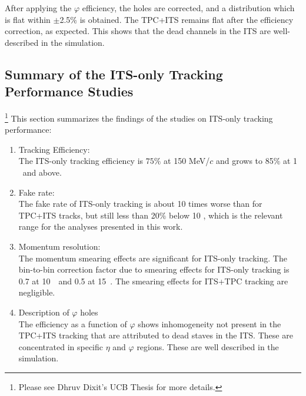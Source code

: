 
After applying the $\varphi$ efficiency, the holes are corrected, and a distribution which is flat within {$\pm$2.5\%} is obtained. The TPC+ITS remains flat after the efficiency correction, as expected. This shows that the dead channels in the ITS are well-described in the simulation. 

\subsection{Summary of the ITS-only Tracking Performance Studies}\footnote{Please see Dhruv Dixit's UCB Thesis for more details.}
\label{sec:sys_tracking}
This section summarizes the findings of the studies on ITS-only tracking performance: 
\begin{enumerate}
\item Tracking Efficiency: \\
The ITS-only tracking efficiency is $75\%$ at 150 MeV/$c$ and grows to 85$\%$ at 1 \GeVc~and above. 
\item Fake rate:\\
The fake rate of ITS-only tracking is about 10 times worse than for TPC+ITS tracks, but still less than 20$\%$ below 10 \GeVc, which is the relevant range for the analyses presented in this work.
\item Momentum resolution:\\
The momentum smearing effects are significant for ITS-only tracking. The bin-to-bin correction factor due to smearing effects for ITS-only tracking is 0.7 at 10~\GeVc~and 0.5 at 15~\GeVc. The smearing effects for ITS+TPC tracking are negligible.
\item Description of $\varphi$ holes\\
The efficiency as a function of $\varphi$ shows inhomogeneity not present in the TPC+ITS tracking that are attributed to dead staves in the ITS. These are concentrated in specific $\eta$ and $\varphi$ regions. These are well described in the simulation. 
\end{enumerate}

